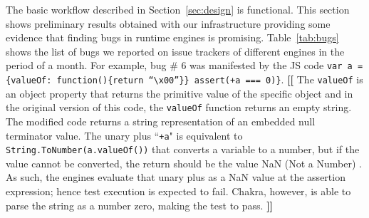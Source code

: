 \documentclass[11pt]{article}
\newcommand{\Igor}[1]{\textbf{[[}{\color{darkaquamarine} #1}\textbf{]]}}
\newcommand{\CodeIn}[1]{{\small\texttt{#1}}}
\begin{document}
The basic workflow described in Section~\ref{sec:design} is functional. This section shows preliminary
results obtained with our infrastructure providing some evidence that finding bugs in runtime engines is
promising. Table~\ref{tab:bugs} shows the list of bugs we reported on
issue trackers of different engines in the period of a month. For
example, bug \# 6 was manifested by the JS code \CodeIn{var a =
  \{valueOf:~function()\{return ``\textbackslash{}x00''\}\} assert(+a
  === 0)\}}. 
\Igor{
  The \CodeIn{valueOf} is an object property that returns the primitive value
  of the specific object\cite{valueof} and in the original version of this code,
  the \CodeIn{valueOf} function returns an empty string.
  The modified code returns a string representation of an embedded null terminator
  value. 
  The unary plus ``\CodeIn{+a}" is equivalent to \CodeIn{String.ToNumber(a.valueOf())} 
  that converts a variable to a number, but if the value cannot be converted, 
  the return should be the value NaN (Not a Number) \cite{unary-plus}.
  As such, the engines evaluate that unary plus as a NaN value 
  at the assertion expression; hence test execution is expected to fail. 
  Chakra, however, is able to parse the string as a number zero, making the test to pass.
}
\newcommand{\checkm}{Y}
\newcommand{\crossmark}{N}
\end{document}

